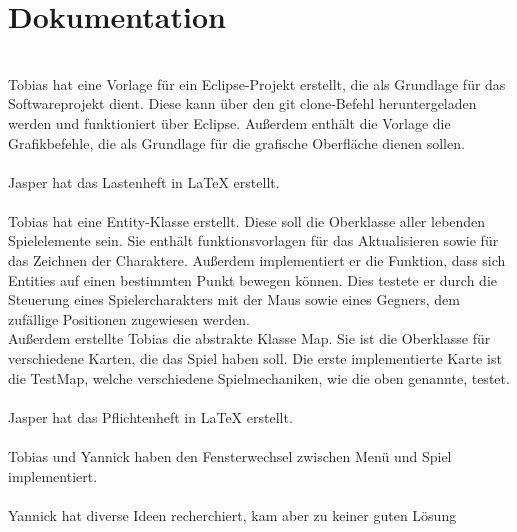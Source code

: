 \newpage
    \section{Dokumentation}
         \\
            Tobias hat eine Vorlage für ein Eclipse-Projekt erstellt, die als Grundlage für das Softwareprojekt dient.
            Diese kann über den \glqq git clone\grqq{}-Befehl heruntergeladen werden und funktioniert über Eclipse.
            Außerdem enthält die Vorlage die Grafikbefehle, die als Grundlage für die grafische Oberfläche dienen sollen.\\
            
         \\
           Jasper hat das Lastenheft in LaTeX erstellt. \\
         
         \\
            Tobias hat eine \glqq Entity\grqq{}-Klasse erstellt.
            Diese soll die Oberklasse aller \glqq lebenden\grqq{} Spielelemente sein.
            Sie enthält funktionsvorlagen für das Aktualisieren sowie für das Zeichnen der Charaktere.
            Außerdem implementiert er die Funktion, dass sich Entities auf einen bestimmten Punkt bewegen können.
            Dies testete er durch die Steuerung eines Spielercharakters mit der Maus sowie eines Gegners, dem zufällige Positionen zugewiesen werden.\\
            Außerdem erstellte Tobias die abstrakte Klasse \glqq Map\grqq{}.
            Sie ist die Oberklasse für verschiedene Karten, die das Spiel haben soll.
            Die erste implementierte Karte ist die \glqq TestMap\grqq{}, welche verschiedene Spielmechaniken, wie die oben genannte, testet.\\
        
         \\
           Jasper hat das Pflichtenheft in LaTeX erstellt.\\ 
           
         \\
            Tobias und Yannick haben den Fensterwechsel zwischen Menü und Spiel implementiert.\\

         \\
            Yannick hat diverse Ideen recherchiert, kam aber zu keiner guten Lösung\\

